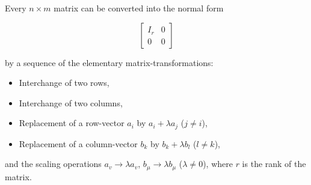 Every $n \times m$ matrix can be converted into the normal form

$$
\begin{bmatrix}
I_r & 0 \\
0 & 0
\end{bmatrix}
$$

by a sequence of the elementary matrix-transformations:
\begin{itemize}
  \item[(I.1)] Interchange of two rows,
  \item[(I.2)] Interchange of two columns,
  \item[(II.1)] Replacement of a row-vector $a_i$ by $a_i + \lambda a_j$ ($j \neq i$),
  \item[(II.2)] Replacement of a column-vector $b_k$ by $b_k + \lambda b_l$ ($l \neq k$),
\end{itemize}
and the scaling operations $a_v \to \lambda a_v$, $b_\mu \to \lambda b_\mu$ ($\lambda \neq 0$), where $r$ is the rank of the matrix.
